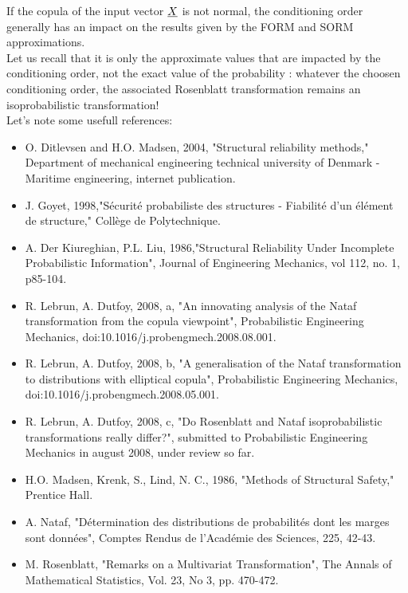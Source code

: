 {              If the copula of the input vector ${\underline{X}}$ is not normal, the conditioning order generally has an impact on the results given by the FORM and SORM approximations.\\

              Let us recall that it is only the approximate values that are impacted by the conditioning order, not the exact value of the probability : whatever the choosen conditioning order, the associated Rosenblatt transformation remains an isoprobabilistic transformation!\\







              Let's note some usefull references:
              \begin{itemize}
              \item O. Ditlevsen and H.O. Madsen, 2004, "Structural reliability methods," Department of mechanical engineering technical university of Denmark - Maritime engineering, internet publication.
              \item J. Goyet, 1998,"Sécurité probabiliste des structures - Fiabilité d'un élément de structure," Collège de Polytechnique.
              \item A. Der Kiureghian, P.L. Liu, 1986,"Structural Reliability Under Incomplete Probabilistic Information", Journal of Engineering Mechanics, vol 112, no. 1, p85-104.
              \item R. Lebrun, A. Dutfoy, 2008, a, "An innovating analysis of the Nataf transformation from the copula viewpoint", Probabilistic  Engineering Mechanics, doi:10.1016/j.probengmech.2008.08.001.
              \item R. Lebrun, A. Dutfoy, 2008, b, "A generalisation of the Nataf transformation to distributions with elliptical copula", Probabilistic  Engineering Mechanics, doi:10.1016/j.probengmech.2008.05.001.
              \item R. Lebrun, A. Dutfoy, 2008, c, "Do Rosenblatt and Nataf isoprobabilistic transformations really differ?", submitted to Probabilistic  Engineering Mechanics in august 2008, under review so far.
              \item  H.O. Madsen, Krenk, S., Lind, N. C., 1986, "Methods of Structural Safety," Prentice Hall.
              \item  A. Nataf, "Détermination des distributions de probabilités dont les marges sont données", Comptes Rendus de l'Académie des Sciences, 225, 42-43.
              \item  M. Rosenblatt, "Remarks on a Multivariat Transformation", The Annals of Mathematical Statistics, Vol. 23, No 3, pp. 470-472.
              \end{itemize}


            }


